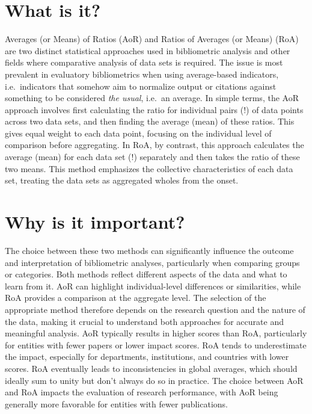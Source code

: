 \documentclass[
  letterpaper,
]{scrreprt}
\begin{document}
\section{What is it?}\label{what-is-it-2}

Averages (or Means) of Ratios (AoR) and Ratios of Averages (or Means)
(RoA) are two distinct statistical approaches used in bibliometric
analysis and other fields where comparative analysis of data sets is
required. The issue is most prevalent in evaluatory bibliometrics when
using average-based indicators, i.e.~indicators that somehow aim to
normalize output or citations against something to be considered
\emph{the usual}, i.e.~an average. In simple terms, the AoR approach
involves first calculating the ratio for individual pairs (!) of data
points across two data sets, and then finding the average (mean) of
these ratios. This gives equal weight to each data point, focusing on
the individual level of comparison before aggregating. In RoA, by
contrast, this approach calculates the average (mean) for each data set
(!) separately and then takes the ratio of these two means. This method
emphasizes the collective characteristics of each data set, treating the
data sets as aggregated wholes from the onset.

\section{Why is it important?}\label{why-is-it-important-9}

The choice between these two methods can significantly influence the
outcome and interpretation of bibliometric analyses, particularly when
comparing groups or categories. Both methods reflect different aspects
of the data and what to learn from it. AoR can highlight
individual-level differences or similarities, while RoA provides a
comparison at the aggregate level. The selection of the appropriate
method therefore depends on the research question and the nature of the
data, making it crucial to understand both approaches for accurate and
meaningful analysis. AoR typically results in higher scores than RoA,
particularly for entities with fewer papers or lower impact scores. RoA
tends to underestimate the impact, especially for departments,
institutions, and countries with lower scores. RoA eventually leads to
inconsistencies in global averages, which should ideally sum to unity
but don't always do so in practice. The choice between AoR and RoA
impacts the evaluation of research performance, with AoR being generally
more favorable for entities with fewer publications.
\end{document}
